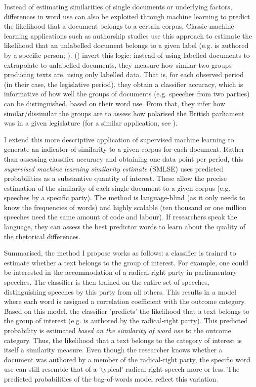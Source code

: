 \documentclass{article}
\begin{document}
Instead of estimating similarities of single documents or underlying factors, differences in word use can also be exploited through machine learning to predict the likelihood that a document belongs to a certain corpus. Classic machine learning applications such as authorship studies use this approach to estimate the likelihood that an unlabelled document belongs to a given label (e.g. is authored by a specific person; \cite{Mosteller1963}). \citeauthor{Peterson2018} (\citeyear{Peterson2018}) invert this logic: instead of using labelled documents to extrapolate to unlabelled documents, they measure how similar two groups producing texts are, using only labelled data. That is, for each observed period (in their case, the legislative period), they obtain a classifier accuracy, which is informative of how well the groups of documents (e.g. speeches from two parties) can be distinguished, based on their word use. From that, they infer how similar/dissimilar the groups are to assess how polarised the British parliament was in a given legislature (for a similar application, see \cite{Gentzkow2019}).\par 

I extend this more descriptive application of supervised machine learning to generate an indicator of similarity to a given corpus for each document. Rather than assessing classifier accuracy and obtaining one data point per period, this \textit{supervised machine learning similarity estimate} (SMLSE) uses predicted probabilities as a substantive quantity of interest. These allow the precise estimation of the similarity of each single document to a given corpus (e.g. speeches by a specific party). The method is language-blind (as it only needs to know the frequencies of words) and highly scalable (ten thousand or one million speeches need the same amount of code and labour). If researchers speak the language, they can assess the best predictor words to learn about the quality of the rhetorical differences. \par

Summarised, the method I propose works as follows: a classifier is trained to estimate whether a text belongs to the group of interest. For example, one could be interested in the accommodation of a radical-right party in parliamentary speeches. The classifier is then trained on the entire set of speeches, distinguishing speeches by this party from all others. This results in a model where each word is assigned a correlation coefficient with the outcome category. Based on this model, the classifier 'predicts' the likelihood that a text belongs to the group of interest (e.g. is authored by the radical-right party). This predicted probability is estimated \textit{based on the similarity of word use} to the outcome category. Thus, the likelihood that a text belongs to the category of interest is itself a similarity measure. Even though the researcher knows whether a document was authored by a member of the radical-right party, the specific word use can still resemble that of a 'typical' radical-right speech more or less. The predicted probabilities of the bag-of-words model reflect this variation. \par
\end{document}
